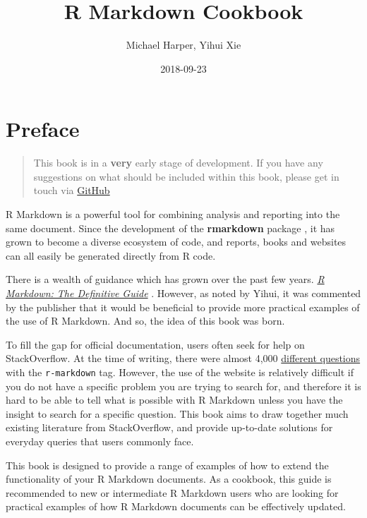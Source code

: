 \documentclass[]{book}
\title{R Markdown Cookbook}
\author{Michael Harper, Yihui Xie}
\date{2018-09-23}
\begin{document}
\maketitle

{
\setcounter{tocdepth}{1}
\tableofcontents
}
\chapter*{Preface}\label{preface}

\begin{quote}
This book is in a \textbf{very} early stage of development. If you have
any suggestions on what should be included within this book, please get
in touch via
\href{https://github.com/mikey-harper/rmarkdown-cookbook}{GitHub}
\end{quote}

R Markdown is a powerful tool for combining analysis and reporting into
the same document. Since the development of the \textbf{rmarkdown}
package \citep{R-rmarkdown}, it has grown to become a diverse ecosystem
of code, and reports, books and websites can all easily be generated
directly from R code.

There is a wealth of guidance which has grown over the past few years.
\href{https://bookdown.org/yihui/rmarkdown/}{\emph{R Markdown: The
Definitive Guide}} \citep{xie2018}. However, as noted by Yihui, it was
commented by the publisher that it would be beneficial to provide more
practical examples of the use of R Markdown. And so, the idea of this
book was born.

To fill the gap for official documentation, users often seek for help on
StackOverflow. At the time of writing, there were almost 4,000
\href{https://stackoverflow.com/questions/tagged/r-markdown}{different
questions} with the \texttt{r-markdown} tag. However, the use of the
website is relatively difficult if you do not have a specific problem
you are trying to search for, and therefore it is hard to be able to
tell what is possible with R Markdown unless you have the insight to
search for a specific question. This book aims to draw together much
existing literature from StackOverflow, and provide up-to-date solutions
for everyday queries that users commonly face.

This book is designed to provide a range of examples of how to extend
the functionality of your R Markdown documents. As a cookbook, this
guide is recommended to new or intermediate R Markdown users who are
looking for practical examples of how R Markdown documents can be
effectively updated.
\end{document}
